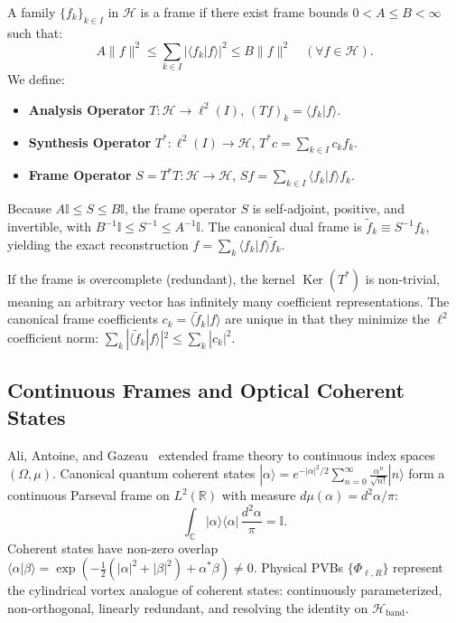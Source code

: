 \documentclass[11pt,a4paper]{article}
\begin{document}
A family $\{f_k\}_{k \in I}$ in $\mathcal{H}$ is a frame if there exist frame bounds $0 < A \le B < \infty$ such that:
\begin{equation}
A \|f\|^2 \le \sum_{k \in I} |\langle f_k | f \rangle|^2 \le B \|f\|^2 \quad (\forall f \in \mathcal{H}).
\label{eq:app_discrete_frame}
\end{equation}
We define:
\begin{itemize}
    \item \textbf{Analysis Operator} $T: \mathcal{H} \to \ell^2(I)$, $(T f)_k = \langle f_k | f \rangle$.
    \item \textbf{Synthesis Operator} $T^*: \ell^2(I) \to \mathcal{H}$, $T^* c = \sum_{k \in I} c_k f_k$.
    \item \textbf{Frame Operator} $S = T^* T: \mathcal{H} \to \mathcal{H}$, $S f = \sum_{k \in I} \langle f_k | f \rangle f_k$.
\end{itemize}
Because $A \mathbb{I} \le S \le B \mathbb{I}$, the frame operator $S$ is self-adjoint, positive, and invertible, with $B^{-1} \mathbb{I} \le S^{-1} \le A^{-1} \mathbb{I}$. The canonical dual frame is $\widetilde{f}_k \equiv S^{-1} f_k$, yielding the exact reconstruction $f = \sum_k \langle f_k | f \rangle \widetilde{f}_k$.

If the frame is overcomplete (redundant), the kernel $\operatorname{Ker}(T^*)$ is non-trivial, meaning an arbitrary vector has infinitely many coefficient representations. The canonical frame coefficients $c_k = \langle \widetilde{f}_k | f \rangle$ are unique in that they minimize the $\ell^2$ coefficient norm: $\sum_k |\langle \widetilde{f}_k | f \rangle|^2 \le \sum_k |c_k|^2$.

\subsection{Continuous Frames and Optical Coherent States}

Ali, Antoine, and Gazeau~\cite{Ali1993,Gazeau2009} extended frame theory to continuous index spaces $(\Omega, \mu)$. Canonical quantum coherent states $|\alpha\rangle = e^{-|\alpha|^2/2} \sum_{n=0}^\infty \frac{\alpha^n}{\sqrt{n!}} |n\rangle$ form a continuous Parseval frame on $L^2(\mathbb{R})$ with measure $d\mu(\alpha) = d^2\alpha / \pi$:
\begin{equation}
\int_{\mathbb{C}} |\alpha\rangle \langle \alpha| \, \frac{d^2\alpha}{\pi} = \mathbb{I}.
\label{eq:app_coherent_resolution}
\end{equation}
Coherent states have non-zero overlap $\langle \alpha | \beta \rangle = \exp(-\frac{1}{2}(|\alpha|^2 + |\beta|^2) + \alpha^* \beta) \neq 0$. Physical PVBs $\{\Phi_{\ell, R}\}$ represent the cylindrical vortex analogue of coherent states: continuously parameterized, non-orthogonal, linearly redundant, and resolving the identity on $\mathcal{H}_{\text{band}}$.
\end{document}
